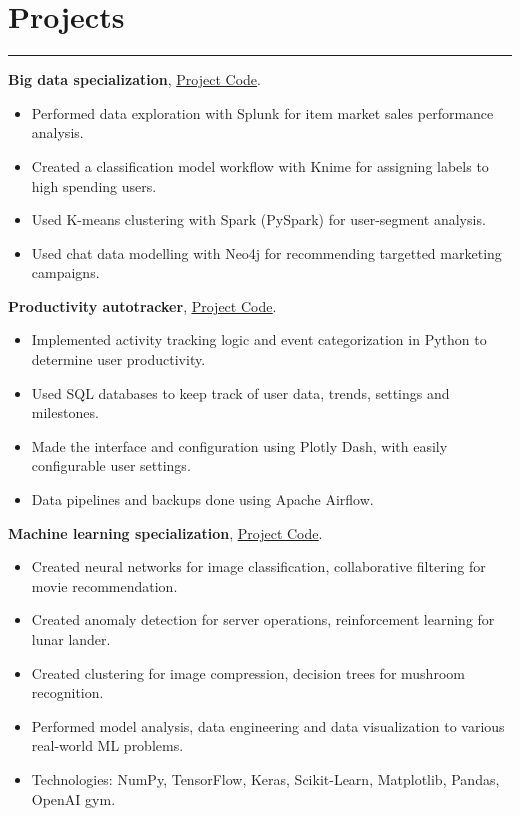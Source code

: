\documentclass[a4paper,10pt]{article}
\newcommand{\ulink}[2]{\href{#1}{\underline{#2}}}
\begin{document}
\section*{Projects}
\hrule
\vspace{2mm}
\textbf{Big data specialization}, \ulink{https://github.com/rokobo/Big-Data-Specialization}{Project Code}.
\begin{itemize}[itemsep=0pt]
  \item Performed data exploration with Splunk for item market sales performance analysis.
  \item Created a classification model workflow with Knime for assigning labels to high spending users.
  \item Used K-means clustering with Spark (PySpark) for user-segment analysis.
  \item Used chat data modelling with Neo4j for recommending targetted marketing campaigns.
\end{itemize}
\textbf{Productivity autotracker}, \ulink{https://github.com/rokobo/Productivity-autotracker}{Project Code}.
\begin{itemize}[itemsep=0pt]
  \item Implemented activity tracking logic and event categorization in Python to determine user productivity.
  \item Used SQL databases to keep track of user data, trends, settings and milestones.
  \item Made the interface and configuration using Plotly Dash, with easily configurable user settings.
  \item Data pipelines and backups done using Apache Airflow.
\end{itemize}
\textbf{Machine learning specialization}, \ulink{https://github.com/rokobo/Machine-learning-specialization}{Project Code}.
\begin{itemize}[itemsep=0pt]
  \item Created neural networks for image classification, collaborative filtering for movie recommendation.
  \item Created anomaly detection for server operations, reinforcement learning for lunar lander.
  \item Created clustering for image compression, decision trees for mushroom recognition.
  \item Performed model analysis, data engineering and data visualization to various real-world ML problems.
  \item Technologies: NumPy, TensorFlow, Keras, Scikit-Learn, Matplotlib, Pandas, OpenAI gym.
\end{itemize}
\end{document}
